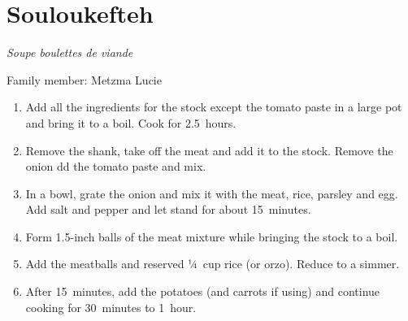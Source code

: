 \chapter{Souloukefteh}
\label{ch:souloukefteh}


\textit{Soupe boulettes de viande}

Family member: Metzma Lucie

\begin{enumerate}
    \item Add all the ingredients for the stock except the tomato paste in a large pot and bring it to a boil. Cook for 2.5~hours.
    \item Remove the shank, take off the meat and add it to the stock. Remove the onion dd the tomato paste and mix.
    \item In a bowl, grate the onion and mix it with the meat, rice, parsley and egg. Add salt and pepper and let stand for about 15~minutes.
    \item Form 1.5-inch balls of the meat mixture while bringing the stock to a boil.
    \item Add the meatballs and reserved ¼~cup rice (or orzo). Reduce to a simmer.
    \item After 15~minutes, add the potatoes (and carrots if using) and continue cooking for 30~minutes to 1~hour.
\end{enumerate}
